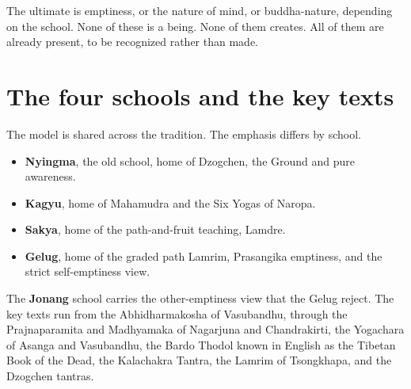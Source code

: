 The ultimate is emptiness, or the nature of mind, or buddha-nature, depending on the school. None of these is a being. None of them creates. All of them are already present, to be recognized rather than made.

\section*{The four schools and the key texts}

The model is shared across the tradition. The emphasis differs by school.

\begin{itemize}
 \item \textbf{Nyingma}, the old school, home of Dzogchen, the Ground and pure awareness.
 \item \textbf{Kagyu}, home of Mahamudra and the Six Yogas of Naropa.
 \item \textbf{Sakya}, home of the path-and-fruit teaching, Lamdre.
 \item \textbf{Gelug}, home of the graded path Lamrim, Prasangika emptiness, and the strict self-emptiness view.
\end{itemize}

The \textbf{Jonang} school carries the other-emptiness view that the Gelug reject. The key texts run from the Abhidharmakosha of Vasubandhu, through the Prajnaparamita and Madhyamaka of Nagarjuna and Chandrakirti, the Yogachara of Asanga and Vasubandhu, the Bardo Thodol known in English as the Tibetan Book of the Dead, the Kalachakra Tantra, the Lamrim of Tsongkhapa, and the Dzogchen tantras.
